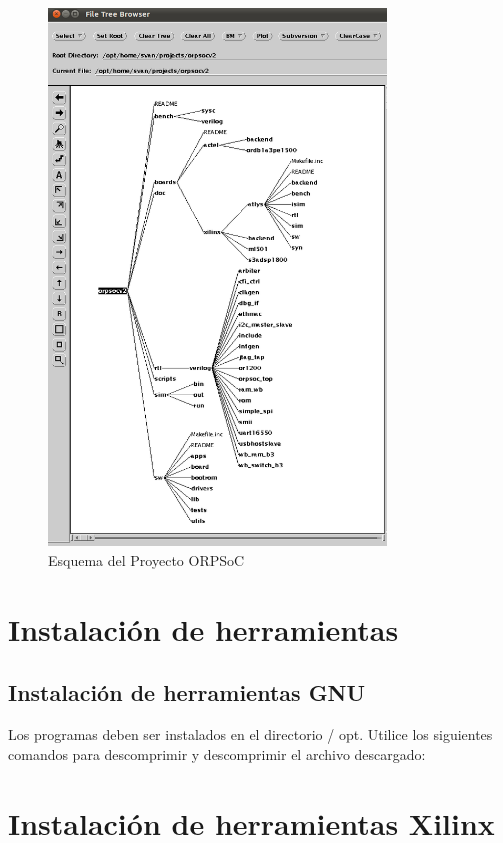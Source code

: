 \begin{figure}[h!]
 \begin{center}
  \includegraphics[width=0.8\textwidth,keepaspectratio=true]{./images/proyectoorpsoc}
  \caption{Esquema del Proyecto ORPSoC }
  \label{fig:esquema}
 \end{center}
\end{figure}

 \section{Instalación de herramientas}
 \subsection{Instalación de herramientas GNU}

Los programas deben ser instalados en el directorio / opt. Utilice los siguientes comandos para descomprimir y descomprimir el archivo descargado: 


 \section{Instalación de herramientas Xilinx}

